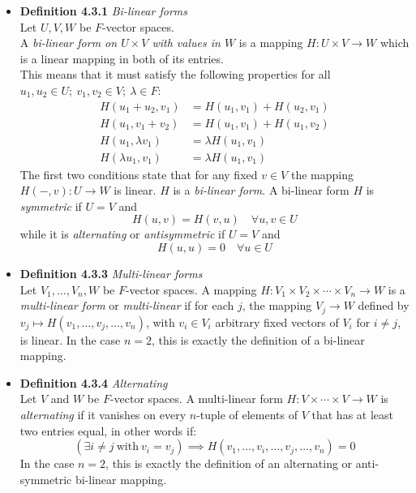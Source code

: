 \documentclass[11pt,a4paper]{article}
\begin{document}
\begin{itemize}
    \item \textbf{Definition 4.3.1} \emph{Bi-linear forms} \\
        Let $U,V, W$ be $F$-vector spaces. \\
        A \emph{bi-linear form on $U \times V$ with values in $W$} is a mapping
        $H:U \times V \to W$ which is a linear mapping in both of its entries. \\
        This means that it must satisfy the following properties for all
        $u_1, u_2 \in U; \ v_1, v_2 \in V; \ \lambda \in F$:
        \begin{align*}{}
            H(u_1 + u_2, v_1)   &= H(u_1, v_1) + H(u_2, v_1) \\
            H(u_1, v_1 + v_2)   &= H(u_1, v_1) + H(u_1, v_2) \\
            H(u_1, \lambda v_1) &= \lambda H(u_1, v_1) \\
            H(\lambda u_1, v_1) &= \lambda H(u_1, v_1)
        \end{align*}
        The first two conditions state that for any fixed $v \in V$ the mapping
        $H(-, v) : U \to W$ is linear.
        $H$ is a \emph{bi-linear form}.
        A bi-linear form $H$ is \emph{symmetric} if $U=V$ and
        \[
            H(u, v) = H(v, u) \quad \forall u, v \in U
        \]
        while it is \emph{alternating} or \emph{antisymmetric} if $U=V$ and
        \[
            H(u, u) = 0 \quad \forall u \in U
        \]

    \item \textbf{Definition 4.3.3} \emph{Multi-linear forms} \\
        Let $V_1, \ldots, V_n, W$ be $F$-vector spaces.
        A mapping $H : V_1 \times V_2 \times \cdots \times V_n \to W$ is a
        \emph{multi-linear form} or \emph{multi-linear} if for each $j$,
        the mapping $V_j \to W$ defined by $v_j \mapsto H(v_1, \ldots, v_j, \ldots, v_n)$,
        with $v_i \in V_i$ arbitrary fixed vectors of $V_i$ for $i \neq j$, is linear.
        In the case $n=2$, this is exactly the definition of a bi-linear mapping.

    \item \textbf{Definition 4.3.4} \emph{Alternating} \\
        Let $V$ and $W$ be $F$-vector spaces.
        A multi-linear form $H : V \times \cdots \times V \to W$
        is \emph{alternating} if it vanishes on every $n$-tuple of elements of $V$ that has at
        least two entries equal, in other words if:
        \[
            (\exists i \neq j \ \mathrm{with} \ v_i = v_j) \implies
            H(v_1, \ldots, v_i, \ldots, v_j, \ldots, v_n) = 0
        \]
        In the case $n=2$, this is exactly the definition of an alternating or anti-symmetric
        bi-linear mapping.


\end{itemize}
\end{document}
